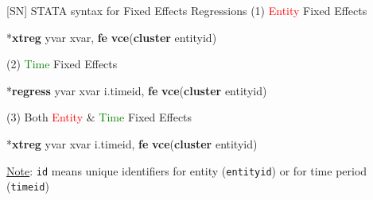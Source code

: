 \documentclass[
  10pt,
  ignorenonframetext,
]{beamer}
\newenvironment{Shaded}{\begin{snugshade}}{\end{snugshade}}
\newcommand{\KeywordTok}[1]{\textcolor[rgb]{0.13,0.29,0.53}{\textbf{#1}}}
\newcommand{\NormalTok}[1]{#1}
\begin{document}
\begin{frame}[fragile]{{[}SN{]} STATA syntax for Fixed Effects
Regressions}
\protect\hypertarget{sn-stata-syntax-for-fixed-effects-regressions}{}
\normalsize(1) \textcolor{red}{Entity} Fixed Effects\small

\begin{Shaded}
\begin{Highlighting}[]
\NormalTok{*}\KeywordTok{xtreg}\NormalTok{ yvar xvar, }\KeywordTok{fe} \KeywordTok{vce}\NormalTok{(}\KeywordTok{cluster}\NormalTok{ entityid)}
\end{Highlighting}
\end{Shaded}

\normalsize(2) \textcolor{green}{Time} Fixed Effects\small

\begin{Shaded}
\begin{Highlighting}[]
\NormalTok{*}\KeywordTok{regress}\NormalTok{ yvar xvar i.timeid, }\KeywordTok{fe} \KeywordTok{vce}\NormalTok{(}\KeywordTok{cluster}\NormalTok{ entityid)}
\end{Highlighting}
\end{Shaded}

\normalsize(3) Both \textcolor{red}{Entity} \(\&\)
\textcolor{green}{Time} Fixed Effects\small

\begin{Shaded}
\begin{Highlighting}[]
\NormalTok{*}\KeywordTok{xtreg}\NormalTok{ yvar xvar i.timeid, }\KeywordTok{fe} \KeywordTok{vce}\NormalTok{(}\KeywordTok{cluster}\NormalTok{ entityid)}
\end{Highlighting}
\end{Shaded}

\footnotesize

\underline{Note}: \texttt{id} means unique identifiers for entity
(\texttt{entityid}) or for time period (\texttt{timeid})
\end{frame}
\end{document}
